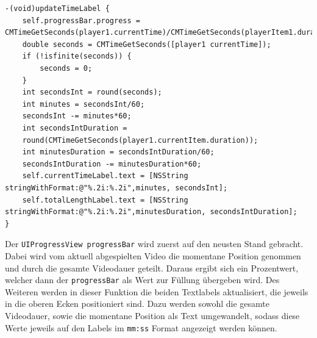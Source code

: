 \documentclass[11pt,a4paper]{report}
\begin{document}
\begin{lstlisting}
-(void)updateTimeLabel {
    self.progressBar.progress = CMTimeGetSeconds(player1.currentTime)/CMTimeGetSeconds(playerItem1.duration);
    double seconds = CMTimeGetSeconds([player1 currentTime]);
    if (!isfinite(seconds)) {
        seconds = 0;
    }
    int secondsInt = round(seconds);
    int minutes = secondsInt/60;
    secondsInt -= minutes*60;
    int secondsIntDuration =
    round(CMTimeGetSeconds(player1.currentItem.duration));
    int minutesDuration = secondsIntDuration/60;
    secondsIntDuration -= minutesDuration*60;
    self.currentTimeLabel.text = [NSString stringWithFormat:@"%.2i:%.2i",minutes, secondsInt];
    self.totalLengthLabel.text = [NSString stringWithFormat:@"%.2i:%.2i",minutesDuration, secondsIntDuration];
}
\end{lstlisting}
Der \texttt{UIProgressView progressBar} wird zuerst auf den neusten Stand gebracht. Dabei wird vom aktuell abgespielten Video die momentane Position genommen und durch die gesamte Videodauer geteilt. Daraus ergibt sich ein Prozentwert, welcher dann der \texttt{progressBar} als Wert zur Füllung übergeben wird. Des Weiteren werden in dieser Funktion die beiden Textlabels aktualisiert, die jeweils in die oberen Ecken positioniert sind. Dazu werden sowohl die gesamte Videodauer, sowie die momentane Position als Text umgewandelt, sodass diese Werte jeweils auf den Labels im \texttt{mm:ss} Format angezeigt werden können.
\end{document}
